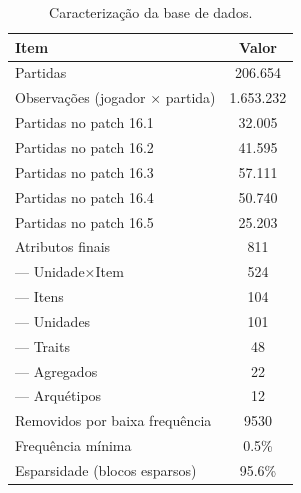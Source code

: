 \begin{table}[htbp]
\caption{Caracterização da base de dados.}
\label{tab:dados}
\centering
\small
\begin{tabular}{lc}
\toprule
Item & Valor \\
\midrule
Partidas & 206.654 \\
Observações (jogador × partida) & 1.653.232 \\
  Partidas no patch 16.1 & 32.005 \\
  Partidas no patch 16.2 & 41.595 \\
  Partidas no patch 16.3 & 57.111 \\
  Partidas no patch 16.4 & 50.740 \\
  Partidas no patch 16.5 & 25.203 \\
Atributos finais & 811 \\
  — Unidade×Item & 524 \\
  — Itens & 104 \\
  — Unidades & 101 \\
  — Traits & 48 \\
  — Agregados & 22 \\
  — Arquétipos & 12 \\
Removidos por baixa frequência & 9530 \\
Frequência mínima & 0.5\% \\
Esparsidade (blocos esparsos) & 95.6\% \\
\bottomrule
\end{tabular}
\end{table}
